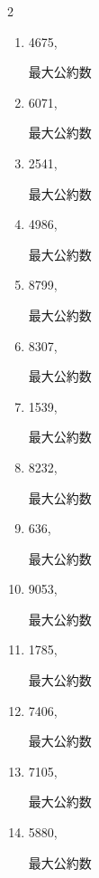 \begin{multicols}{2}
\begin{enumerate}
        最大公約数

  \item 4675,

        最大公約数

  \item 6071,

        最大公約数

  \item 2541,

        最大公約数

\columnbreak %

  \item 4986,

        最大公約数

  \item 8799,

        最大公約数

  \item 8307,

        最大公約数

  \item 1539,

        最大公約数

  \item 8232,

        最大公約数

\columnbreak %

\resetques

  \item 636,

        最大公約数

  \item 9053,

        最大公約数

  \item 1785,

        最大公約数

  \item 7406,

        最大公約数

  \item 7105,

        最大公約数

\columnbreak %

  \item 5880,

        最大公約数


\end{enumerate}
\end{multicols}
